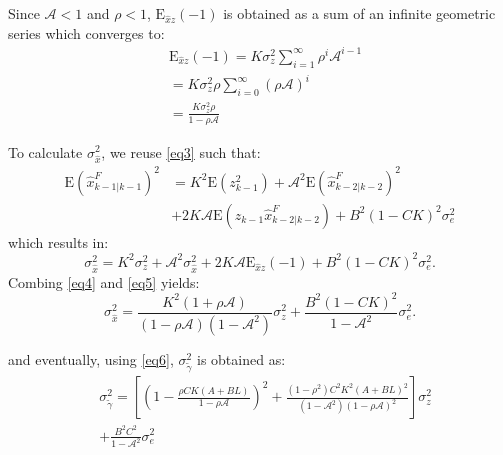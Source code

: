 \documentclass[journal,10pt]{IEEEtran}
\def\no{\nonumber}
\begin{document}
Since $\mathcal{A}<1$ and $\rho<1$, $\mathrm{E}_{\hat{x}z}(-1)$ is
obtained as a sum of an infinite geometric series which converges
to:
\begin{eqnarray}
&\mathrm{E}_{\hat{x}z}(-1)=K\sigma_{z}^{2}\sum\limits_{i=1}^{\infty}\rho^{i}\mathcal{A}^{i-1}\no\\
&=K\sigma_{z}^{2}\rho\sum\limits_{i=0}^{\infty}(\rho\mathcal{A})^{i}\no\\
&=\frac{K\sigma_{z}^{2}\rho}{1-\rho\mathcal{A}}\label{eq4}
\end{eqnarray}

To calculate $\sigma_{\hat{x}}^{2}$, we reuse \eqref{eq3}
such that:
\begin{align}
\mathrm{E}(\hat{x}^F_{k-1|k-1})^2 & =K^{2}\mathrm{E}(z_{k-1}^{2})+\mathcal{A}^{2}\mathrm{E}(\hat{x}^F_{k-2|k-2})^{2}
\nonumber \\
& +2K\mathcal{A}\mathrm{E}(z_{k-1}\hat{x}^F_{k-2|k-2})
+B^{2}(1-CK)^{2}\sigma_{e}^{2}
\end{align}
which results in:
\begin{equation}
\sigma_{\hat{x}}^2=K^{2}\sigma_{z}^2+\mathcal{A}^{2}\sigma_{\hat{x}}^2+2K\mathcal{A}\mathrm{E}_{\hat{x}z}(-1)+B^{2}(1-CK)^{2}\sigma_{e}^{2}.\label{eq5}
\end{equation}
Combing \eqref{eq4} and \eqref{eq5} yields:
\begin{equation}
\sigma_{\hat{x}}^2=\frac{K^{2}(1+\rho\mathcal{A})}{(1-\rho\mathcal{A})(1-\mathcal{A}^{2})}\sigma_{z}^2+\frac{B^{2}(1-CK)^{2}}{1-\mathcal{A}^{2}}\sigma_{e}^{2}.
\end{equation}

and eventually, using \eqref{eq6}, $\sigma_{\tilde{\gamma}}^{2}$ is
obtained as:
\begin{eqnarray}
&\sigma_{\tilde{\gamma}}^{2}=[(1-\frac{\rho
CK(A+BL)}{1-\rho\mathcal{A}})^{2}+\frac{(1-\rho^{2})C^{2}K^{2}(A+BL)^{2}}{(1-\mathcal{A}^{2})(1-\rho\mathcal{A})^{2}}]\sigma_{z}^{2}\no\\
&+\frac{B^{2}C^{2}}{1-\mathcal{A}^{2}}\sigma_{e}^{2}\no
\end{eqnarray}
\end{document}
